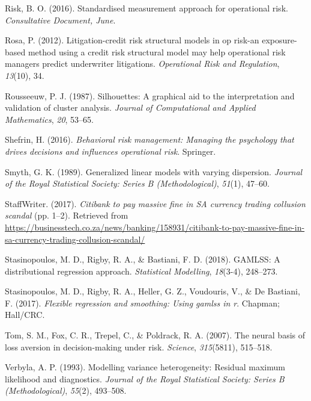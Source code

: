 \documentclass{DissertateUSU}
\begin{document}
\leavevmode\hypertarget{ref-risk2016supporting}{}%
Risk, B. O. (2016). Standardised measurement approach for operational
risk. \emph{Consultative Document, June}.

\leavevmode\hypertarget{ref-rosa2012litigation}{}%
Rosa, P. (2012). Litigation-credit risk structural models in op risk-an
exposure-based method using a credit risk structural model may help
operational risk managers predict underwriter litigations.
\emph{Operational Risk and Regulation}, \emph{13}(10), 34.

\leavevmode\hypertarget{ref-rousseeuw1987silhouettes}{}%
Rousseeuw, P. J. (1987). Silhouettes: A graphical aid to the
interpretation and validation of cluster analysis. \emph{Journal of
Computational and Applied Mathematics}, \emph{20}, 53--65.

\leavevmode\hypertarget{ref-shefrin2016behavioral}{}%
Shefrin, H. (2016). \emph{Behavioral risk management: Managing the
psychology that drives decisions and influences operational risk}.
Springer.

\leavevmode\hypertarget{ref-smyth1989generalized}{}%
Smyth, G. K. (1989). Generalized linear models with varying dispersion.
\emph{Journal of the Royal Statistical Society: Series B
(Methodological)}, \emph{51}(1), 47--60.

\leavevmode\hypertarget{ref-bustech2017}{}%
StaffWriter. (2017). \emph{Citibank to pay massive fine in SA currency
trading collusion scandal} (pp. 1--2). Retrieved from
\url{https://businesstech.co.za/news/banking/158931/citibank-to-pay-massive-fine-in-sa-currency-trading-collusion-scandal/}

\leavevmode\hypertarget{ref-stasinopoulos2018gamlss}{}%
Stasinopoulos, M. D., Rigby, R. A., \& Bastiani, F. D. (2018). GAMLSS: A
distributional regression approach. \emph{Statistical Modelling},
\emph{18}(3-4), 248--273.

\leavevmode\hypertarget{ref-stasinopoulos2017flexible}{}%
Stasinopoulos, M. D., Rigby, R. A., Heller, G. Z., Voudouris, V., \& De
Bastiani, F. (2017). \emph{Flexible regression and smoothing: Using
gamlss in r}. Chapman; Hall/CRC.

\leavevmode\hypertarget{ref-tom2007neural}{}%
Tom, S. M., Fox, C. R., Trepel, C., \& Poldrack, R. A. (2007). The
neural basis of loss aversion in decision-making under risk.
\emph{Science}, \emph{315}(5811), 515--518.

\leavevmode\hypertarget{ref-verbyla1993modelling}{}%
Verbyla, A. P. (1993). Modelling variance heterogeneity: Residual
maximum likelihood and diagnostics. \emph{Journal of the Royal
Statistical Society: Series B (Methodological)}, \emph{55}(2), 493--508.
\end{document}

